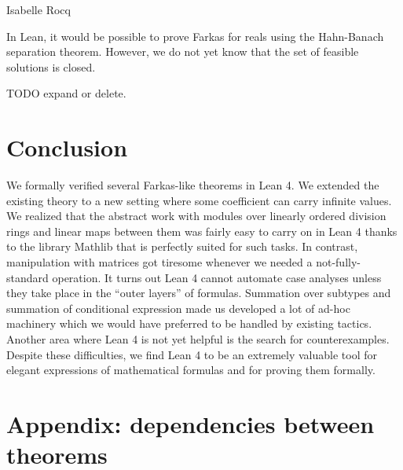 \documentclass[]{article}
\renewcommand{\.}{\hskip .75pt}
\begin{document}
Isabelle \cite{Farkas-AFP} \cite{Linear-AFP} \cite{Duality-AFP}
Rocq \cite{Simplex-Coq}

In Lean, it would be possible to prove Farkas for reals using the
Hahn-Banach separation theorem. However, we do not yet know that
the set of feasible solutions is closed.

TODO expand or delete.


\section {Conclusion}

We formally verified several Farkas-like theorems in Lean 4.
We extended the existing theory to a new setting where some
coefficient can carry infinite values. We realized that the
abstract work with modules over linearly ordered division rings
and linear maps between them was fairly easy to carry on in
Lean 4 thanks to the library Mathlib that is perfectly suited
for such tasks. In contrast, manipulation with matrices got
tiresome whenever we needed a not-fully-standard operation.
It turns out Lean 4 cannot automate case analyses unless they
take place in the ``outer layers'' of formulas. Summation
over subtypes and summation of conditional expression made
us developed a lot of ad-hoc machinery which we would have
preferred to be handled by existing tactics. Another area
where Lean 4 is not yet helpful is the search for counterexamples.
Despite these difficulties, we find Lean 4 to be an extremely
valuable tool for elegant expressions of mathematical formulas
and for proving them formally.







%

\section{Appendix: dependencies between theorems}
\end{document}
